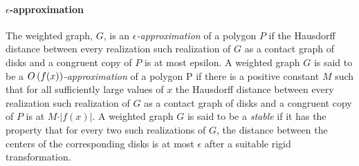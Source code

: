 \paragraph{$\epsilon$-approximation}
The weighted graph, $G$, is an \textit{$\epsilon$-approximation} of a polygon $P$ if the Hausdorff distance between every realization such realization of $G$ as a contact graph of disks and a congruent copy of $P$ is at most epsilon.  A weighted graph $G$ is said to be a \textit{$O\left( f(x) \right)$-approximation} of a polygon P if there is a positive constant $M$ such that for all sufficiently large values of $x$ the Hausdorff distance between every realization such realization of $G$ as a contact graph of disks and a congruent copy of $P$ is at $M \cdot \vert f(x)\vert$. A weighted graph $G$ is said to be a \textit{stable} if it has the property that for every two such realizations of $G$, the distance between the centers of the corresponding disks is at most $\epsilon$ after a suitable rigid transformation.  
%
%
%
%
%
%

